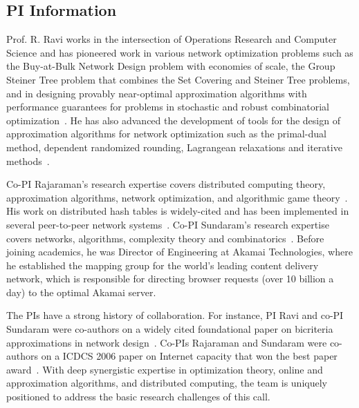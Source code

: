 \subsection{PI Information}
Prof. R. Ravi works in the intersection of Operations Research and
Computer Science and has pioneered work in various network
optimization problems such as the Buy-at-Bulk Network Design problem
with economies of scale, the Group Steiner Tree problem that combines
the Set Covering and Steiner Tree problems, and in designing provably
near-optimal approximation algorithms with performance guarantees for
problems in stochastic and robust combinatorial
optimization~\cite{dgrs05,GKNR12,GRS07,garg+kr:steiner,rs06,SCRS01}. He has
also advanced the development of tools for the design of approximation
algorithms for network optimization such as the primal-dual method,
dependent randomized rounding, Lagrangean relaxations and iterative
methods~\cite{AKR95,LRS11,RG96}.

Co-PI Rajaraman's research expertise covers distributed computing
theory, approximation algorithms, network optimization, and
algorithmic game
theory~\cite{chen+klrsv:flow,jia+rs:dominateFull,kintali+prst:fractional}.
His work on distributed hash tables is widely-cited and has been
implemented in several peer-to-peer network
systems~\cite{plaxton+rr:access}.  Co-PI Sundaram's research expertise
covers networks, algorithms, complexity theory and
combinatorics~\cite{chen+klrsv:flow,kintali+prst:fractional,OurPODC08,RS98}.
Before joining academics, he was Director of Engineering at Akamai
Technologies, where he established the mapping group for the world's
leading content delivery network, which is responsible for directing
browser requests (over 10 billion a day) to the optimal Akamai server.

The PIs have a strong history of collaboration.  For instance, PI Ravi
and co-PI Sundaram were co-authors on a widely cited foundational
paper on bicriteria approximations in network design~\cite{MRSRRH98}.
Co-PIs Rajaraman and Sundaram were co-authors on a ICDCS 2006 paper on
Internet capacity that won the best paper award~\cite{chen+mrs:flow}.
With deep synergistic expertise in optimization theory, online and
approximation algorithms, and distributed computing, the team is
uniquely positioned to address the basic research challenges of this
call.

